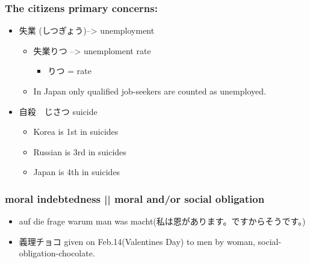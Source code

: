 \documentclass{article}
\newcommand\tabni[1][0.2cm]{\hspace*{#1}}
\begin{document}
\subsubsection{The citizens primary concerns:}
\begin{itemize}%
\item 失業 (しつぎょう)--> unemployment
\begin{itemize}
\item 失業りつ --> unemploment rate
\begin{itemize}%
\item りつ = rate
\end{itemize}
\item In Japan only qualified job-seekers are counted as unemployed.
\end{itemize}
\item 自殺　じさつ suicide
\begin{itemize}%
\item Korea is 1st in suicides
\item Russian is 3rd in suicides
\item Japan is 4th in suicides \\
\end{itemize}
\end{itemize}
\subsubsection{ \tabni moral indebtedness ||  \tabni moral and/or social obligation}
\begin{itemize}%
\item auf die frage warum man was macht(私は恩があります。ですからそうです。) \\
\end{itemize}
\begin{itemize}%
\item 義理チョコ given on Feb.14(Valentines Day) to men by woman, social-obligation-chocolate. \\
\end{itemize}
\end{document}
